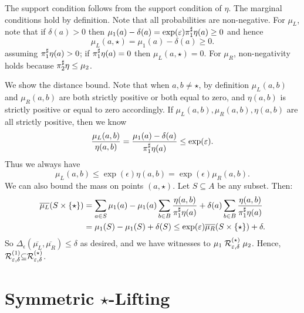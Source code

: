 \documentclass{lmcs}
\begin{document}
  The support condition follows from the support condition of $\eta$. The
  marginal conditions hold by definition. Note that all probabilities are
  non-negative. For $\mu_L$, note that if $\delta(a) > 0$ then $\mu_1(a) -
  \delta(a) = \exp(\varepsilon) \pi_{1}^{\sharp} \eta(a) \geq 0$ and hence
  \[
    \mu_L(a, \star) = \mu_1(a) - \delta(a) \geq 0 .
  \]
  assuming $\pi_{1}^{\sharp}\eta(a) > 0$; if $\pi_{1}^{\sharp}\eta(a) = 0$ then $\mu_L(a, \star) = 0$.
  For $\mu_R$, non-negativity holds because $\pi_{2}^{\sharp} \eta \leq \mu_2$.
  
  We show the distance bound.  Note that when $a, b \neq \star$, by definition
  $\mu_L(a, b)$ and $\mu_R(a, b)$ are both strictly positive or both equal to
  zero, and $\eta(a, b)$ is strictly positive or equal to zero accordingly.  If
  $\mu_L(a, b), \mu_R(a, b), \eta(a, b)$ are all strictly positive, then we know
  \[
    \frac{\mu_L(a, b)}{\eta(a, b)}
    = \frac{\mu_1(a) - \delta(a)}{\pi_{1}^{\sharp}\eta(a)} \leq \exp(\varepsilon) .
  \]
  Thus we always have
  \[
    \mu_L(a, b) \leq \exp(\epsilon) \eta(a, b) = \exp(\epsilon) \mu_R(a, b) .
  \]
  We can also bound the mass on points $(a, \star)$. Let $S \subseteq A$ be
  any subset. Then:
  \begin{align*}
    \overline{\mu_L}(S \times \{ \star \}) &= \sum_{a \in S} \mu_1(a)
    - \mu_1(a) \sum_{b \in B} \frac{\eta(a, b)}{\pi_{1}^{\sharp} \eta(a)}
    + \delta(a) \sum_{b \in B} \frac{\eta(a, b)}{\pi_{1}^{\sharp} \eta(a)} \\
    &= \mu_1(S) - \mu_1(S) + \delta(S)
    \leq \exp(\varepsilon) \overline{\mu_R}(S \times \{ \star \}) + \delta .
  \end{align*}
  So $\Delta_{\epsilon}(\overline{\mu_L},\overline{\mu_R}) \leq \delta$ as
  desired, and we have witnesses to $\mu_1 \mathrel{\mathrel{\mathcal{R}}^{(\star)}_{\varepsilon, \delta}}
  \mu_2$. Hence, $\mathrel{\mathrel{\mathcal{R}}^{(1)}_{\varepsilon, \delta}} \subseteq
  \mathrel{\mathrel{\mathcal{R}}^{(\star)}_{\varepsilon, \delta}}$.
\endproofatend

\section{%
  \texorpdfstring
  {Symmetric $\star$-Lifting}
  {Symmetric *-Lifting}} \label{s:sym}
\end{document}
